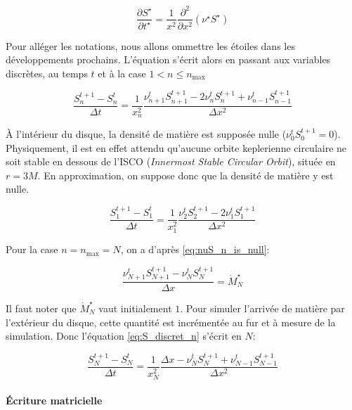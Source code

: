 \begin{equation}
  \frac{\partial S^\star}{\partial t^\star} = \frac{1}{x^2}\frac{\partial^2}{\partial x^2}\left(\nu^\star S^\star\right)
\end{equation}

Pour alléger les notations, nous allons ommettre les étoiles dans les
développements prochains. L'équation s'écrit alors en passant aux variables
discrètes, au temps $t$ et à la case $1<n\leq n_\textrm{max}$

\begin{equation}
  \label{eq:S_discret_n}
  \frac{S^{t+1}_n - S^t_n}{\Delta t} = \frac{1}{x_n^2}\frac{\nu^t_{n+1}S^{t+1}_{n+1} - 2 \nu^t_nS^{t+1}_n + \nu^t_{n-1}S^{t+1}_{n-1}}{\Delta x^2}
\end{equation}

À l'intérieur du disque, la densité de matière est supposée nulle
($\nu^t_{0}S^{t+1}_{0} = 0$). Physiquement, il est en effet attendu qu'aucune
orbite keplerienne circulaire ne soit stable en dessous de l'ISCO
(\emph{\emph{I}nnermost \emph{S}table \emph{C}ircular \emph{O}rbit}), située en
$r = 3M$. En approximation, on suppose donc que la densité de matière y est
nulle.

\begin{equation}
  \label{eq:S_discret_1}
  \frac{S^{t+1}_1 - S^t_1}{\Delta t} = \frac{1}{x_1^2}\frac{\nu^t_{2}S^{t+1}_{2} - 2 \nu^t_1S^{t+1}_1}{\Delta x^2}
\end{equation}

Pour la case $n = n_\textrm{max} = N$, on a d'après \eqref{eq:nuS_n_is_null}:

\begin{equation}
  \frac{\nu^{t}_{N+1}S^{t+1}_{N+1} - \nu^{t}_NS^{t+1}_N}{\Delta x} = \dot{M}^\star_N
\end{equation}

Il faut noter que $\dot{M}^\star_N$ vaut initialement $1$. Pour simuler
l'arrivée de matière par l'extérieur du disque, cette quantité est incrémentée
au fur et à mesure de la simulation. Donc l'équation \eqref{eq:S_discret_n}
s'écrit en $N$:

\begin{equation}
  \label{eq:S_discret_N}
  \frac{S^{t+1}_N - S^t_N}{\Delta t} = \frac{1}{x_N^2}\frac{\Delta x - \nu^{t}_NS^{t+1}_N + \nu^{t}_{N-1}S^{t+1}_{N-1}}{\Delta x^2}
\end{equation}

\paragraph{Écriture matricielle}

